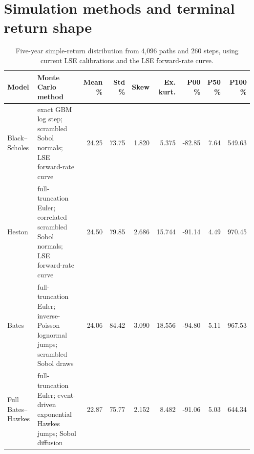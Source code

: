 \documentclass[a4paper,10pt,titlepage,oneside,openany]{book}
\theoremstyle{plain}
\theoremstyle{definition}
\theoremstyle{remark}
\begin{document}
\section*{Simulation methods and terminal return shape}
\begin{table}[H]
\centering
\fontsize{7.2}{8.2}\selectfont
\setlength{\tabcolsep}{2.2pt}
\begin{tabularx}{\textwidth}{@{}p{2.0cm}Xrrrrrrr@{}}
\toprule
Model & Monte Carlo method & Mean \% & Std \% & Skew & Ex. kurt. & P00 \% & P50 \% & P100 \% \\
\midrule
Black--Scholes & exact GBM log step; scrambled Sobol normals; LSE forward-rate curve & 24.25 & 73.75 & 1.820 & 5.375 & -82.85 & 7.64 & 549.63 \\
Heston & full-truncation Euler; correlated scrambled Sobol normals; LSE forward-rate curve & 24.50 & 79.85 & 2.686 & 15.744 & -91.14 & 4.49 & 970.45 \\
Bates & full-truncation Euler; inverse-Poisson lognormal jumps; scrambled Sobol draws & 24.06 & 84.42 & 3.090 & 18.556 & -94.80 & 5.11 & 967.53 \\
Full Bates--Hawkes & full-truncation Euler; event-driven exponential Hawkes jumps; Sobol diffusion & 22.87 & 75.77 & 2.152 & 8.482 & -91.06 & 5.03 & 644.34 \\
\bottomrule
\end{tabularx}
\caption{Five-year simple-return distribution from 4,096 paths and 260 steps, using current LSE calibrations and the LSE forward-rate curve.}
\label{tab:appendix-simulation}
\end{table}
\end{document}
